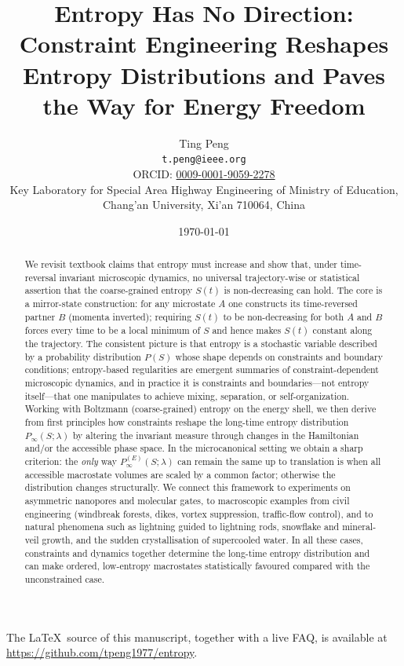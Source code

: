 \documentclass[11pt,a4paper]{article}
\title{Entropy Has No Direction: Constraint Engineering Reshapes Entropy Distributions and Paves the Way for Energy Freedom}
\author{Ting Peng\\
  \texttt{t.peng@ieee.org}\\
  ORCID: \href{https://orcid.org/0009-0001-9059-2278}{0009-0001-9059-2278}\\
  Key Laboratory for Special Area Highway Engineering of Ministry of Education,\\
  Chang'an University, Xi'an 710064, China}
\date{\today}
\begin{document}
\maketitle

\noindent\footnotesize The \LaTeX\ source of this manuscript, together with a live FAQ, is available at \url{https://github.com/tpeng1977/entropy}.

\begin{abstract}
We revisit textbook claims that entropy must increase and show that, under
time-reversal invariant microscopic dynamics, no universal trajectory-wise or
statistical assertion that the coarse-grained entropy $S(t)$ is non-decreasing
can hold. The core is a mirror-state construction: for any microstate $A$ one
constructs its time-reversed partner $B$ (momenta inverted); requiring $S(t)$
to be non-decreasing for both $A$ and $B$ forces every time to be a local
minimum of $S$ and hence makes $S(t)$ constant along the trajectory. The
consistent picture is that entropy is a stochastic variable described by a
probability distribution $P(S)$ whose shape depends on constraints and boundary
conditions; entropy-based regularities are emergent summaries of
constraint-dependent microscopic dynamics, and in practice it is constraints
and boundaries---not entropy itself---that one manipulates to achieve mixing,
separation, or self-organization.
Working with Boltzmann (coarse-grained) entropy on the energy shell, we then
derive from first principles how constraints reshape the long-time entropy
distribution $P_{\infty}(S;\lambda)$ by altering the invariant measure through
changes in the Hamiltonian and/or the accessible phase space. In the
microcanonical setting we obtain a sharp criterion: the \emph{only} way
$P_{\infty}^{(E)}(S;\lambda)$ can remain the same up to translation is when all
accessible macrostate volumes are scaled by a common factor; otherwise the
distribution changes structurally. We connect this framework to experiments on
asymmetric nanopores and molecular gates, to macroscopic examples from civil
engineering (windbreak forests, dikes, vortex suppression, traffic-flow
control), and to natural phenomena such as lightning guided to lightning rods,
snowflake and mineral-veil growth, and the sudden crystallisation of supercooled
water. In all these cases, constraints and dynamics together determine the
long-time entropy distribution and can make ordered, low-entropy macrostates
statistically favoured compared with the unconstrained case.
\end{abstract}
\end{document}
